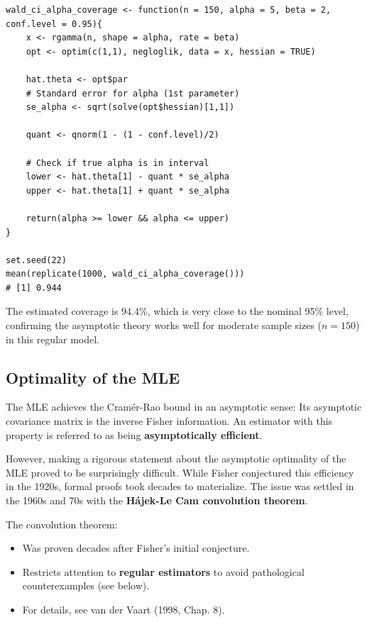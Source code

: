 \begin{ex}
\begin{verbatim}
wald_ci_alpha_coverage <- function(n = 150, alpha = 5, beta = 2, conf.level = 0.95){
    x <- rgamma(n, shape = alpha, rate = beta)
    opt <- optim(c(1,1), negloglik, data = x, hessian = TRUE)
    
    hat.theta <- opt$par
    # Standard error for alpha (1st parameter)
    se_alpha <- sqrt(solve(opt$hessian)[1,1])
    
    quant <- qnorm(1 - (1 - conf.level)/2)
    
    # Check if true alpha is in interval
    lower <- hat.theta[1] - quant * se_alpha
    upper <- hat.theta[1] + quant * se_alpha
    
    return(alpha >= lower && alpha <= upper)
}

set.seed(22)
mean(replicate(1000, wald_ci_alpha_coverage()))
# [1] 0.944
\end{verbatim}
The estimated coverage is 94.4\%, which is very close to the nominal 95\% level, confirming the asymptotic theory works well for moderate sample sizes ($n=150$) in this regular model.
\end{ex}

\subsection{Optimality of the MLE}
\label{sub:Optimality of the MLE}

The MLE achieves the Cramér-Rao bound in an asymptotic sense: Its asymptotic covariance matrix is the inverse Fisher information. An estimator with this property is referred to as being \textbf{asymptotically efficient}.

However, making a rigorous statement about the asymptotic optimality of the MLE proved to be surprisingly difficult. While Fisher conjectured this efficiency in the 1920s, formal proofs took decades to materialize. The issue was settled in the 1960s and 70s with the \textbf{Hájek-Le Cam convolution theorem}.

\begin{note}
The convolution theorem:
\begin{itemize}
    \item Was proven decades after Fisher's initial conjecture.
    \item Restricts attention to \textbf{regular estimators} to avoid pathological counterexamples (see below).
    \item For details, see van der Vaart (1998, Chap. 8).
\end{itemize}
\end{note}

